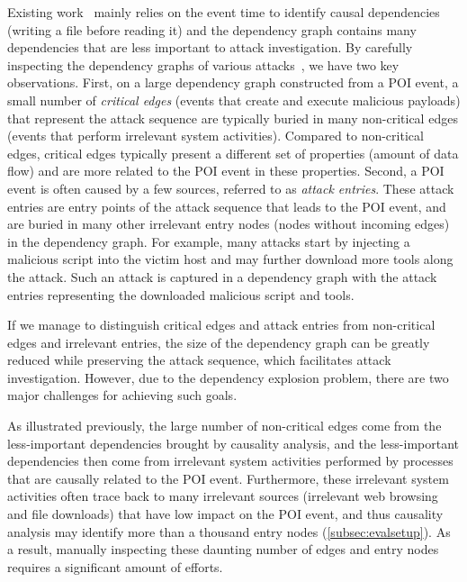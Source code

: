 Existing work~\cite{backtracking,backtracking2,taser,intrusionrecovery,liu2018priotracker,mcitracking,hassan2019nodoze,ma2016protracer}
mainly relies on the event time to identify causal dependencies (\eg writing a file before reading it) and the 
dependency graph contains many dependencies that are less important to attack investigation.
By carefully inspecting the dependency graphs of various attacks~\cite{gao2018aiql,mcitracking,liu2018priotracker,ma2016protracer}, we have two key observations.
%
First, on a large dependency graph constructed from a POI event,
a small number of \emph{critical edges} (\eg events that create and execute malicious payloads) that represent the attack sequence are typically buried in many non-critical edges (\eg events that perform irrelevant system activities).
Compared to non-critical edges, critical edges typically present a different set of properties (\eg amount of data flow) 
and are more related to the POI event in these properties.
Second, a POI event is often caused by a few sources, referred to as \emph{attack entries}.
These attack entries are entry points of the attack sequence that leads to the POI event, and are buried in many other irrelevant entry nodes (\ie nodes without incoming edges) in the dependency graph.
For example, many attacks start by injecting a malicious script into the victim host 
and may further download more tools along the attack.
Such an attack is captured in a dependency graph with the attack entries representing the downloaded malicious script and tools. 
%






If we manage to distinguish critical edges and attack entries from non-critical edges and irrelevant entries, 
the size of the dependency graph can be greatly reduced while preserving the attack sequence, which facilitates attack investigation.
However, due to the dependency explosion problem,
there are two major challenges for achieving such goals.

%
As illustrated previously, the large number of non-critical edges come from the less-important dependencies brought by causality analysis, and the less-important dependencies then come from irrelevant system activities performed by processes that are causally related to the POI event.
Furthermore, these irrelevant system activities often trace back to many irrelevant sources (\eg irrelevant web browsing and file downloads) that have low impact on the POI event, and thus causality analysis may identify more than a thousand entry nodes (\cref{subsec:evalsetup}).
As a result, manually inspecting these daunting number of edges and entry nodes requires a significant amount of efforts.

